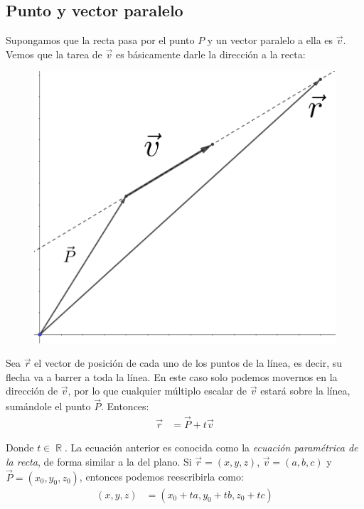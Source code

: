\documentclass[12pt, fleqn]{report}                             %
\theoremstyle{break}                                            %
\DeclareMathOperator \Reals        {\mathbb{R}}                 %
\begin{document}
            \clearpage
    
            \subsection{Punto y vector paralelo}
            
            Supongamos que la recta pasa por el punto $P$ y un vector paralelo a ella es $\vec{v}$. Vemos que la tarea de $\vec{v}$ es básicamente darle la dirección a la recta:
            
            \begin{figure}[H]
                \centering
                \includegraphics[scale=1.2]{line.png}
            \end{figure}
        
            Sea $\vec{r}$ el vector de posición de cada uno de los puntos de la línea, es decir, su flecha va a barrer a toda la línea. En este caso solo podemos movernos en la dirección de $\vec{v}$, por lo que cualquier múltiplo escalar de $\vec{v}$ estará sobre la línea, sumándole el punto $\vec{P}$. Entonces:
            \begin{align}
                \vec{r} &= \vec{P} + t\vec{v} \label{lineEquationGeneral}
            \end{align}
            
            Donde $t \in \Reals$. La ecuación anterior es conocida como la \emph{ecuación paramétrica de la recta}, de forma similar a la del plano. Si $\vec{r}=(x,y,z)$, $\vec{v}=(a,b,c)$ y $\vec{P}=(x_0,y_0,z_0)$, entonces podemos reescribirla como:
            \begin{align*}
                (x, y, z) &= (x_0 + ta, y_0 + tb, z_0 + tc)
            \end{align*}
            
\end{document}
